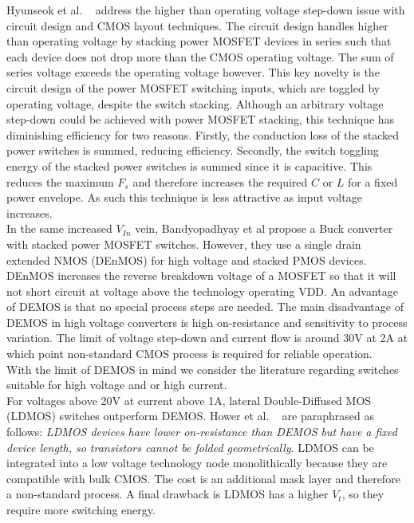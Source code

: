 \documentclass[letterpaper,twocolumn,10pt]{article}
\begin{document}
\indent Hyunseok et al. ~\cite{Hyunseok2012} address the higher than operating voltage step-down issue with circuit design and CMOS layout techniques. The circuit design handles higher than operating voltage by stacking power MOSFET devices in series such that each device does not drop more than the CMOS operating voltage. The sum of series voltage exceeds the operating voltage however. This key novelty is the circuit design of the power MOSFET switching inputs, which are toggled by operating voltage, despite the switch stacking. Although an arbitrary voltage step-down could be achieved with power MOSFET stacking, this technique has diminishing efficiency for two reasons. Firstly, the conduction loss of the stacked power switches is summed, reducing efficiency. Secondly, the switch toggling energy of the stacked power switches is summed since it is capacitive. This reduces the maximum $F_s$ and therefore increases the required $C$ or $L$ for a fixed power envelope. As such this technique is less attractive as input voltage increases.\\
\indent In the same increased $V_{In}$ vein, Bandyopadhyay et al\cite{Bandyopadhyay2011} propose a Buck converter with stacked power MOSFET switches. However, they use a single drain extended NMOS (DEnMOS) for high voltage and stacked PMOS devices. DEnMOS increases the reverse breakdown voltage of a MOSFET so that it will not short circuit at voltage above the technology operating VDD. An advantage of DEMOS is that no special process steps are needed. The main disadvantage of DEMOS in high voltage converters is high on-resistance and sensitivity to process variation. The limit of voltage step-down and current flow is around 30V at 2A \cite{Hower2005} at which point non-standard CMOS process is required for reliable operation.\\
\indent With the limit of DEMOS in mind we consider the literature regarding switches suitable for high voltage and or high current.\\
For voltages above 20V at current above 1A, lateral Double-Diffused MOS (LDMOS) switches outperform DEMOS. Hower et al. ~\cite{Hower2005} are paraphrased as follows: \textit{LDMOS devices have lower on-resistance than DEMOS but have a fixed device length, so transistors cannot be folded geometrically}. LDMOS can be integrated into a low voltage technology node monolithically because they are compatible with bulk CMOS. The cost is an additional mask layer and therefore a non-standard process. A final drawback is LDMOS has a higher $V_t$, so they require more switching energy.\\
\end{document}
